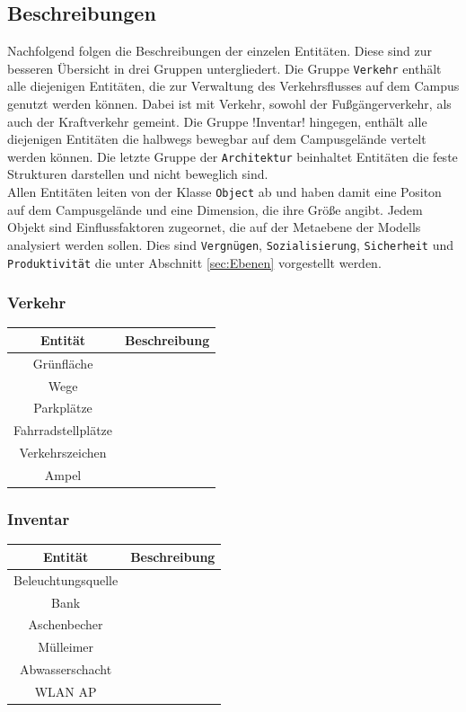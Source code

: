 \documentclass[10pt]{scrartcl}
\begin{document}
	\subsection{Beschreibungen}
	Nachfolgend folgen die Beschreibungen der einzelen Entitäten. Diese sind zur besseren Übersicht in drei Gruppen untergliedert. Die Gruppe \verb!Verkehr! enthält alle diejenigen Entitäten, die zur Verwaltung des Verkehrsflusses auf dem Campus genutzt werden können. Dabei ist mit Verkehr, sowohl der Fußgängerverkehr, als auch der Kraftverkehr gemeint.
	Die Gruppe \ver!Inventar! hingegen, enthält alle diejenigen Entitäten die halbwegs bewegbar auf dem Campusgelände vertelt werden können. Die letzte Gruppe der \verb!Architektur! beinhaltet Entitäten die feste Strukturen darstellen und nicht beweglich sind.\\
	Allen Entitäten leiten von der Klasse \verb!Object! ab und haben damit eine Positon auf dem Campusgelände und eine Dimension, die ihre Größe angibt. Jedem Objekt sind Einflussfaktoren zugeornet, die auf der Metaebene der Modells analysiert werden sollen. Dies sind \verb!Vergnügen!,
	\verb!Sozialisierung!, \verb!Sicherheit! und \verb!Produktivität! die unter Abschnitt \ref{sec:Ebenen} vorgestellt werden.
	
	\subsubsection{Verkehr}
	\begin{tabular}{|c|c|}
\hline Entität & Beschreibung \\ 
\hline
\hline Grünfläche &  \\ 
\hline Wege &  \\ 
\hline Parkplätze &  \\ 
\hline Fahrradstellplätze &  \\ 
\hline Verkehrszeichen &  \\ 
\hline Ampel &  \\ 
\hline 
\end{tabular} 

	\subsubsection{Inventar}
\begin{tabular}{|c|c|}
\hline Entität & Beschreibung \\
\hline
\hline Beleuchtungsquelle &  \\ 
\hline Bank &  \\ 
\hline Aschenbecher &  \\ 
\hline Mülleimer &  \\ 
\hline Abwasserschacht &  \\ 
\hline WLAN AP &  \\ 
\hline 
\end{tabular}
\end{document}
